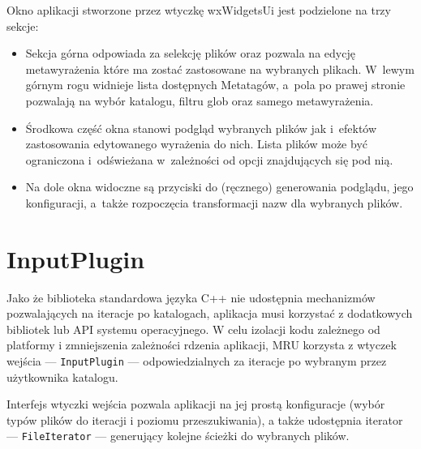 Okno aplikacji stworzone przez wtyczkę wxWidgetsUi jest podzielone na trzy sekcje:
\begin{itemize}
\item Sekcja górna odpowiada za selekcję plików oraz pozwala na edycję metawyrażenia które ma zostać zastosowane na wybranych plikach.
 W~lewym górnym rogu widnieje lista dostępnych Metatagów, a~pola po prawej stronie pozwalają na wybór katalogu, filtru glob oraz samego metawyrażenia.

\item Środkowa część okna stanowi podgląd wybranych plików jak i~efektów zastosowania edytowanego wyrażenia do nich. Lista plików może być ograniczona i~odświeżana w~zależności od opcji znajdujących się pod nią.

\item Na dole okna widoczne są przyciski do (ręcznego) generowania podglądu, jego konfiguracji, a~także rozpoczęcia transformacji nazw dla wybranych plików.
\end{itemize}


\section{InputPlugin}
\par
Jako że biblioteka standardowa języka C++ nie udostępnia mechanizmów pozwalających na iteracje po katalogach, aplikacja musi korzystać z dodatkowych bibliotek lub API systemu operacyjnego. W celu izolacji kodu zależnego od platformy i zmniejszenia zależności rdzenia aplikacji, MRU korzysta z wtyczek wejścia --- \texttt{InputPlugin} --- odpowiedzialnych za iteracje po wybranym przez użytkownika katalogu.
\par
Interfejs wtyczki wejścia pozwala aplikacji na jej prostą konfiguracje (wybór typów plików do iteracji i poziomu przeszukiwania), a także udostępnia iterator --- \texttt{FileIterator} --- generujący kolejne ścieżki do wybranych plików.
